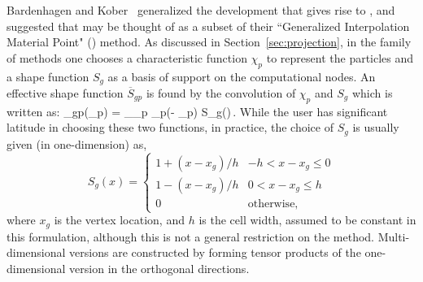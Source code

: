 Bardenhagen and Kober~\cite{Bard2004} generalized the
development that gives rise to \MPM, and suggested that \MPM
may be thought of as a subset of their ``Generalized Interpolation
Material Point" (\GIMP) method.  As discussed in Section~\ref{sec:projection},
in the family of \GIMP methods
one chooses a characteristic function $\chi_p$ to represent
the particles and a shape function $S_g$ as a basis of support on the
computational nodes.  An effective shape function $\overbar{S}_{gp}$  is found
by the convolution of $\chi_p$ and $S_g$ which is written as:
\Beq \label{effectiveS}
 _{gp}(\Bx_p) =   \int_{\Omega_p \cap \Omega} \chi_p(\Bx - \Bx_p) S_g(\Bx)\,\Bx .
\Eeq
While the user has significant latitude in choosing
these two functions, in practice, the choice of $S_g$ is usually given
(in one-dimension) as,
\begin{equation} \label{linear_shape}
S_g\left(x\right) = \begin{cases} 1 + {\left(x-x_g\right) / h} & {-h < x-x_g \le 0} \\
                    1 - {\left(x-x_g\right) / h} & {0  < x-x_g \le h} \\
                    0 & \text{otherwise},
       \end{cases}
\end{equation}
where $x_g$ is the vertex location, and $h$ is the cell width, 
assumed to be constant in this formulation, 
although this is not a general restriction on the method.
Multi-dimensional versions are constructed by forming tensor products of the
one-dimensional version in the orthogonal directions.  

